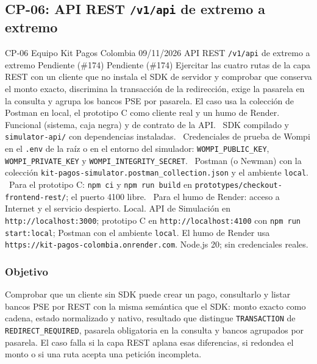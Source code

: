 \subsection{CP-06: API REST \texttt{/v1/api} de extremo a extremo}
\label{anexo:cp06}

\FichaCaso
  {CP-06}
  {Equipo Kit Pagos Colombia}
  {09/11/2026}
  {API REST \texttt{/v1/api} de extremo a extremo}
  {Pendiente (\#174)}
  {Pendiente (\#174)}
  {Ejercitar las cuatro rutas de la capa REST con un cliente que no instala el SDK de servidor y comprobar que conserva el monto exacto, discrimina la transacción de la redirección, exige la pasarela en la consulta y agrupa los bancos PSE por pasarela. El caso usa la colección de Postman en local, el prototipo C como cliente real y un humo de Render.}
  {Funcional (sistema, caja negra) y de contrato de la API.}
  {\textbullet\ SDK compilado y \texttt{simulator-api/} con dependencias instaladas.\newline
   \textbullet\ Credenciales de prueba de Wompi en el \texttt{.env} de la raíz o en el entorno del simulador: \texttt{WOMPI\_PUBLIC\_KEY}, \texttt{WOMPI\_PRIVATE\_KEY} y \texttt{WOMPI\_INTEGRITY\_SECRET}.\newline
   \textbullet\ Postman (o Newman) con la colección \texttt{kit-pagos-simulator.postman\_collection.json} y el ambiente \texttt{local}.\newline
   \textbullet\ Para el prototipo C: \texttt{npm ci} y \texttt{npm run build} en \texttt{prototypes/checkout-frontend-rest/}; el puerto 4100 libre.\newline
   \textbullet\ Para el humo de Render: acceso a Internet y el servicio despierto.}
  {Local. API de Simulación en \texttt{http://localhost:3000}; prototipo C en \texttt{http://localhost:4100} con \texttt{npm run start:local}; Postman con el ambiente \texttt{local}. El humo de Render usa \texttt{https://kit-pagos-colombia.onrender.com}. Node.js 20; sin credenciales reales.}

\subsubsection{Objetivo}

Comprobar que un cliente sin SDK puede crear un pago, consultarlo y listar bancos PSE por REST con la misma semántica que el SDK: monto exacto como cadena, estado normalizado y nativo, resultado que distingue \texttt{TRANSACTION} de \texttt{REDIRECT\_REQUIRED}, pasarela obligatoria en la consulta y bancos agrupados por pasarela. El caso falla si la capa REST aplana esas diferencias, si redondea el monto o si una ruta acepta una petición incompleta.


